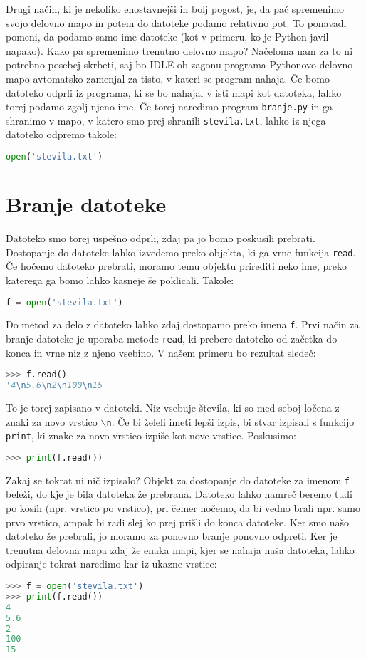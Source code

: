 Drugi način, ki je nekoliko enostavnejši in bolj pogost, je, da pač spremenimo svojo delovno mapo in potem do datoteke podamo relativno pot. To ponavadi pomeni, da podamo samo ime datoteke (kot v primeru, ko je Python javil napako). Kako pa spremenimo trenutno delovno mapo? Načeloma nam za to ni potrebno posebej skrbeti, saj bo IDLE ob zagonu programa Pythonovo delovno mapo avtomatsko zamenjal za tisto, v kateri se program nahaja. Če bomo datoteko odprli iz programa, ki se bo nahajal v isti mapi kot datoteka, lahko torej podamo zgolj njeno ime. Če torej naredimo program \texttt{branje.py} in ga shranimo v mapo, v katero smo prej shranili \texttt{stevila.txt}, lahko iz njega datoteko odpremo takole:
\begin{lstlisting}[language=Python, showstringspaces=false]
open('stevila.txt')
\end{lstlisting}

\section{Branje datoteke}
Datoteko smo torej uspešno odprli, zdaj pa jo bomo poskusili prebrati. Dostopanje do datoteke lahko izvedemo preko objekta, ki ga vrne funkcija \texttt{read}. Če hočemo datoteko prebrati, moramo temu objektu prirediti neko ime, preko katerega ga bomo lahko kasneje še poklicali. Takole:
\begin{lstlisting}[language=Python, showstringspaces=false]
f = open('stevila.txt')
\end{lstlisting}
Do metod za delo z datoteko lahko zdaj dostopamo preko imena \texttt{f}. Prvi način za branje datoteke je uporaba metode \texttt{read}, ki prebere datoteko od začetka do konca in vrne niz z njeno vsebino. V našem primeru bo rezultat sledeč:
\begin{lstlisting}[language=Python, showstringspaces=false]
>>> f.read()
'4\n5.6\n2\n100\n15'
\end{lstlisting}
To je torej zapisano v datoteki. Niz vsebuje števila, ki so med seboj ločena z znaki za novo vrstico \texttt{$\backslash$n}. Če bi želeli imeti lepši izpis, bi stvar izpisali s funkcijo \texttt{print}, ki znake za novo vrstico izpiše kot nove vrstice. Poskusimo:
\begin{lstlisting}[language=Python, showstringspaces=false]
>>> print(f.read())

\end{lstlisting}
Zakaj se tokrat ni nič izpisalo? Objekt za dostopanje do datoteke za imenom \texttt{f} beleži, do kje je bila datoteka že prebrana. Datoteko lahko namreč beremo tudi po kosih (npr. vrstico po vrstico), pri čemer nočemo, da bi vedno brali npr. samo prvo vrstico, ampak bi radi slej ko prej prišli do konca datoteke. Ker smo našo datoteko že prebrali, jo moramo za ponovno branje ponovno odpreti. Ker je trenutna delovna mapa zdaj že enaka mapi, kjer se nahaja naša datoteka, lahko odpiranje tokrat naredimo kar iz ukazne vrstice:
\begin{lstlisting}[language=Python, showstringspaces=false]
>>> f = open('stevila.txt')
>>> print(f.read())
4
5.6
2
100
15
\end{lstlisting}


